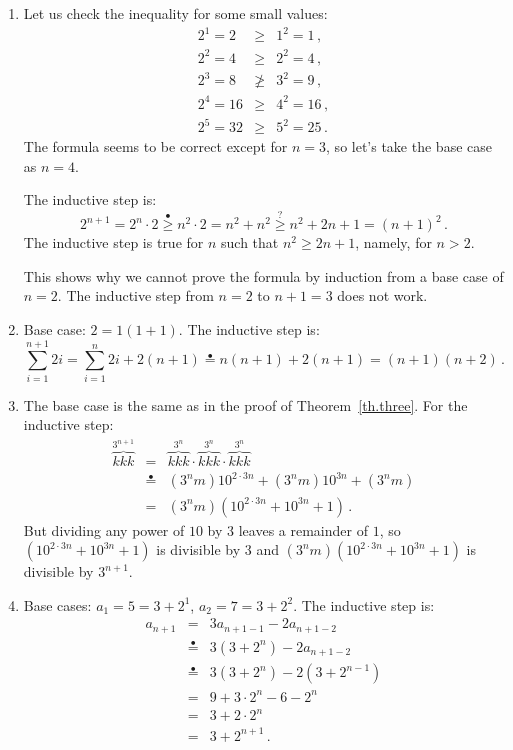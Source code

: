 \documentclass[11pt,a4paper]{report}
\newcommand*{\ih}{\stackrel{\bullet}{=}}
\newcommand*{\ihge}{\stackrel{\bullet}{\geq}}
\begin{document}
\begin{enumerate}
\item Let us check the inequality for some small values:
\begin{eqnarray*}
2^1=2&\geq& 1^2 = 1\,,\\
2^2=4&\geq& 2^2 = 4\,,\\
2^3=8&\not\geq& 3^2 = 9\,,\\
2^4=16&\geq& 4^2 = 16\,,\\
2^5=32&\geq& 5^2 = 25\,.
\end{eqnarray*}
The formula seems to be correct except for $n=3$, so let's take the base case as $n=4$.

The inductive step is:
\[
2^{n+1}=2^n\cdot 2 \ihge{} n^2\cdot 2 = n^2 + n^2 \stackrel{?}{\geq} n^2 + 2n + 1 = (n+1)^2\,.
\]
The inductive step is true for $n$ such that $n^2\geq 2n+1$, namely, for $n>2$.

This shows why we cannot prove the formula by induction from a base case of $n=2$. The inductive step from $n=2$ to $n+1=3$ does not work.

\item Base case: $2=1(1+1)$. The inductive step is:
\[
\sum_{i=1}^{n+1} 2i = \sum_{i=1}^n 2i + 2(n+1) \ih{} n(n+1) + 2(n+1)= (n+1)(n+2)\,.
\]

\item The base case is the same as in the proof of Theorem~\ref{th.three}. For the inductive step:
\begin{eqnarray*}
\overbrace{kkk}^{3^{n+1}} &=& \overbrace{kkk}^{3^n}\cdot\overbrace{kkk}^{3^n}\cdot \overbrace{kkk}^{3^n}\\
&\ih{}&(3^nm)10^{2\cdot 3n} + (3^nm)10^{3n} + (3^nm)\\
&=&(3^nm)(10^{2\cdot 3n} + 10^{3n} + 1)\,.
\end{eqnarray*}
But dividing any power of $10$ by $3$ leaves a remainder of $1$, so $(10^{2\cdot 3n} + 10^{3n} + 1)$ is divisible by $3$ and $(3^nm)(10^{2\cdot 3n} + 10^{3n} + 1)$ is divisible by $3^{n+1}$.

\item Base cases: $a_1=5=3+2^1$, $a_2=7=3+2^2$. The inductive step is:
\begin{eqnarray*}
a_{n+1}&=&3a_{n+1-1}-2a_{n+1-2}\\
&\ih{}&3(3+2^n)-2a_{n+1-2}\\
&\ih{}&3(3+2^n)-2(3+2^{n-1})\\
&=&9 + 3\cdot 2^n-6-2^n\\
&=&3+2\cdot 2^n\\
&=&3+2^{n+1}\,.
\end{eqnarray*}


\end{enumerate}
\end{document}
